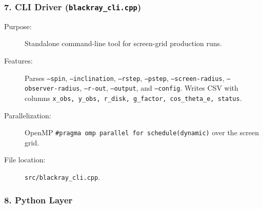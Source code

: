 \documentclass[11pt,twoside]{article}
\begin{document}
\subsubsection{7. CLI Driver (\texttt{blackray\_cli.cpp})}

\begin{description}
\item[Purpose:] Standalone command-line tool for screen-grid production runs.
\item[Features:] Parses \texttt{--spin}, \texttt{--inclination}, \texttt{--rstep},
\texttt{--pstep}, \texttt{--screen-radius}, \texttt{--observer-radius},
\texttt{--r-out}, \texttt{--output}, and \texttt{--config}. Writes CSV with
columns \texttt{x\_obs, y\_obs, r\_disk, g\_factor, cos\_theta\_e, status}.
\item[Parallelization:] OpenMP \texttt{\#pragma omp parallel for schedule(dynamic)}
over the screen grid.
\item[File location:] \texttt{src/blackray\_cli.cpp}.
\end{description}

\subsubsection{8. Python Layer}
\end{document}
